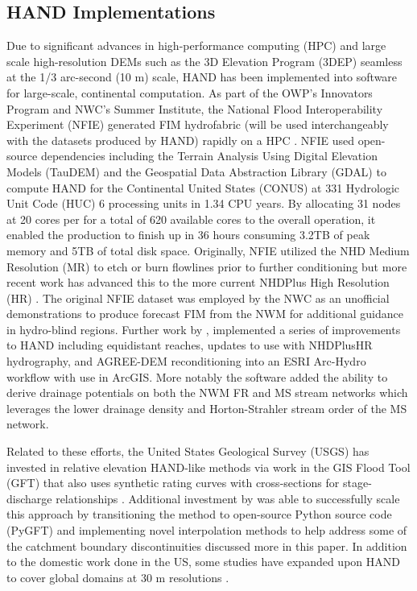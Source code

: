 \subsection{HAND Implementations}
%
Due to significant advances in high-performance computing (HPC) and large scale high-resolution DEMs such as the 3D Elevation Program (3DEP) seamless at the 1/3 arc-second (10 m) scale, HAND has been implemented into software for large-scale, continental computation. 
As part of the OWP's Innovators Program and NWC's Summer Institute, the National Flood Interoperability Experiment (NFIE) generated FIM hydrofabric (will be used interchangeably with the datasets produced by HAND) rapidly on a HPC \cite{maidment2017conceptual,liu2016cybergis}. 
NFIE used open-source dependencies including the Terrain Analysis Using Digital Elevation Models (TauDEM) \cite{tarboton2005terrain} and the Geospatial Data Abstraction Library (GDAL) \cite{warmerdam2008geospatial} to compute HAND for the Continental United States (CONUS) at 331 Hydrologic Unit Code (HUC) 6 processing units in 1.34 CPU years.
By allocating 31 nodes at 20 cores per for a total of 620 available cores to the overall operation, it enabled the production to finish up in 36 hours consuming 3.2TB of peak memory and 5TB of total disk space.
Originally, NFIE utilized the NHD Medium Resolution (MR) to etch or burn flowlines prior to further conditioning but more recent work has advanced this to the more current NHDPlus High Resolution (HR) \cite{liu2020height}. 
The original NFIE dataset was employed by the NWC as an unofficial demonstrations to produce forecast FIM from the NWM for additional guidance in hydro-blind regions.
Further work by , implemented a series of improvements to HAND including equidistant reaches, updates to use with NHDPlusHR hydrography, and AGREE-DEM reconditioning \cite{hellweger1997agree} into an ESRI Arc-Hydro workflow with use in ArcGIS. 
More notably the software added the ability to derive drainage potentials on both the NWM FR and MS stream networks which leverages the lower drainage density and Horton-Strahler stream order of the MS network.

Related to these efforts, the United States Geological Survey (USGS) has invested in relative elevation HAND-like methods via work in the GIS Flood Tool (GFT) that also uses synthetic rating curves with cross-sections for stage-discharge relationships \cite{verdin2016software}.
Additional investment by  was able to successfully scale this approach by transitioning the method to open-source Python source code (PyGFT) and implementing novel interpolation methods to help address some of the catchment boundary discontinuities discussed more in this paper.
In addition to the domestic work done in the US, some studies have expanded upon HAND to cover global domains at 30 m resolutions \cite{yamazaki2019merit,donchyts2016global}.
%
